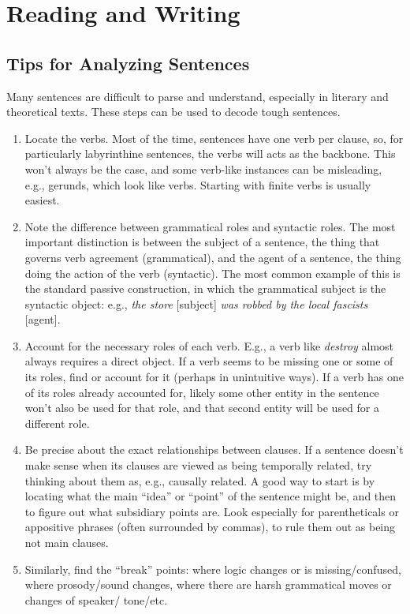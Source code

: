 \documentclass[12pt]{article}
\begin{document}
\section{Reading and Writing}

\subsection{Tips for Analyzing Sentences}
Many sentences are difficult to parse and understand, especially in literary and theoretical texts. These steps can be used to decode tough sentences.

\begin{enumerate}
\item Locate the verbs. Most of the time, sentences have one verb per clause, so, for particularly labyrinthine sentences, the verbs will acts as the backbone. This won’t always be the case, and some verb-like instances can be misleading, e.g., gerunds, which look like verbs. Starting with finite verbs is usually easiest.
\item Note the difference between grammatical roles and syntactic roles. The most important distinction is between the subject of a sentence, the thing that governs verb agreement (grammatical), and the agent of a sentence, the thing doing the action of the verb (syntactic). The most common example of this is the standard passive construction, in which the grammatical subject is the syntactic object: e.g., \textit{the store} [subject] \textit{was robbed by the local fascists} [agent].
\item Account for the necessary roles of each verb. E.g., a verb like \textit{destroy} almost always requires a direct object. If a verb seems to be missing one or some of its roles, find or account for it (perhaps in unintuitive ways). If a verb has one of its roles already accounted for, likely some other entity in the sentence won’t also be used for that role, and that second entity will be used for a different role.
\item Be precise about the exact relationships between clauses. If a sentence doesn’t make sense when its clauses are viewed as being temporally related, try thinking about them as, e.g., causally related. A good way to start is by locating what the main ``idea'' or ``point'' of the sentence might be, and then to figure out what subsidiary points are. Look especially for parentheticals or appositive phrases (often surrounded by commas), to rule them out as being not main clauses.
\item Similarly, find the ``break'' points: where logic changes or is missing/confused, where prosody/sound changes, where there are harsh grammatical moves or changes of speaker/ tone/etc.

\end{enumerate}
\end{document}
